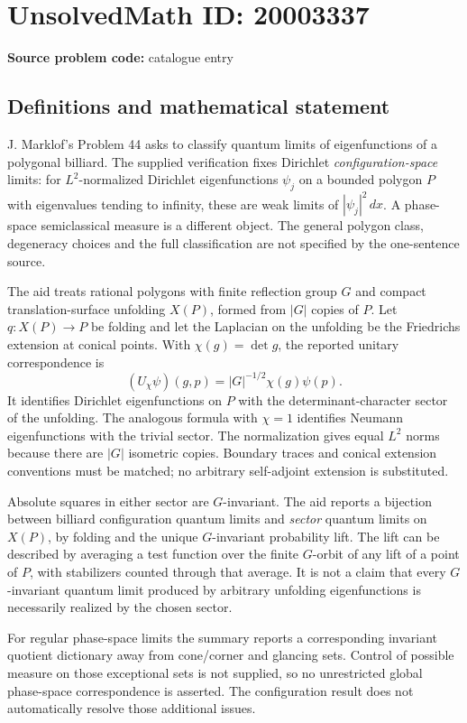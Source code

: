 \documentclass[11pt]{article}
\begin{document}
\section*{UnsolvedMath ID: 20003337}
\textbf{Source problem code:} catalogue entry
\subsection{Definitions and mathematical statement}
J. Marklof's Problem 44 asks to classify quantum limits of eigenfunctions of a polygonal billiard. The supplied verification fixes Dirichlet \emph{configuration-space} limits: for $L^2$-normalized Dirichlet eigenfunctions $\psi_j$ on a bounded polygon $P$ with eigenvalues tending to infinity, these are weak limits of $|\psi_j|^2\,dx$. A phase-space semiclassical measure is a different object. The general polygon class, degeneracy choices and the full classification are not specified by the one-sentence source.

The aid treats rational polygons with finite reflection group $G$ and compact translation-surface unfolding $X(P)$, formed from $|G|$ copies of $P$. Let $q:X(P)\to P$ be folding and let the Laplacian on the unfolding be the Friedrichs extension at conical points. With $\chi(g)=\det g$, the reported unitary correspondence is
\[
 (U_\chi\psi)(g,p)=|G|^{-1/2}\chi(g)\psi(p).
\]
It identifies Dirichlet eigenfunctions on $P$ with the determinant-character sector of the unfolding. The analogous formula with $\chi=1$ identifies Neumann eigenfunctions with the trivial sector. The normalization gives equal $L^2$ norms because there are $|G|$ isometric copies. Boundary traces and conical extension conventions must be matched; no arbitrary self-adjoint extension is substituted.

Absolute squares in either sector are $G$-invariant. The aid reports a bijection between billiard configuration quantum limits and \emph{sector} quantum limits on $X(P)$, by folding and the unique $G$-invariant probability lift. The lift can be described by averaging a test function over the finite $G$-orbit of any lift of a point of $P$, with stabilizers counted through that average. It is not a claim that every $G$-invariant quantum limit produced by arbitrary unfolding eigenfunctions is necessarily realized by the chosen sector.

For regular phase-space limits the summary reports a corresponding invariant quotient dictionary away from cone/corner and glancing sets. Control of possible measure on those exceptional sets is not supplied, so no unrestricted global phase-space correspondence is asserted. The configuration result does not automatically resolve those additional issues.
\end{document}
